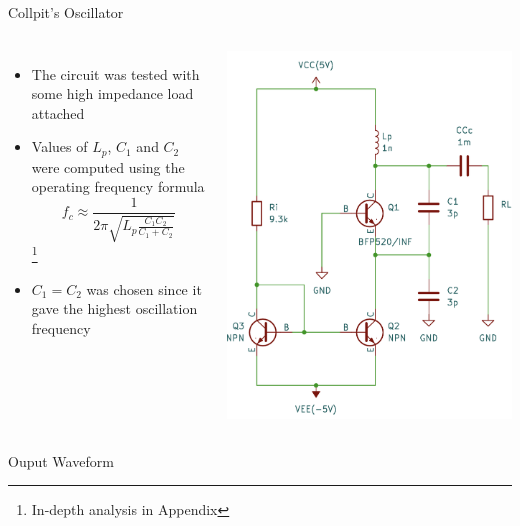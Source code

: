 \documentclass{beamer}
\begin{document}
\begin{frame}{Collpit's Oscillator}
\small
\begin{columns}
  \begin{itemize}
    \item <1-> The circuit was tested with some high impedance load attached
    \item <2-> Values of \(L_p\), \(C_1\) and \(C_2\) were computed using the operating frequency formula \[f_c\approx\frac{1}{2\pi\sqrt{L_p\frac{C_1C_2}{C_1+C_2}}}\] \footnote{In-depth analysis in Appendix}
    \item <3-> \(C_1=C_2\) was chosen since it gave the highest oscillation frequency
  \end{itemize}
  \includegraphics[width=0.95\linewidth]{images/collpits.png}
\end{columns}

\end{frame}

\begin{frame}{Ouput Waveform}


\end{frame}
\end{document}
